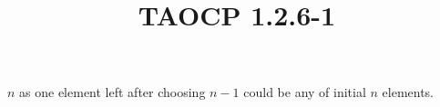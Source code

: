 \documentclass{article}
\title{TAOCP 1.2.6\mbox{-}1}
\begin{document}
\maketitle

\( n \) as one element left after choosing \( n - 1 \) could be any of initial \( n \) elements.
\end{document}
